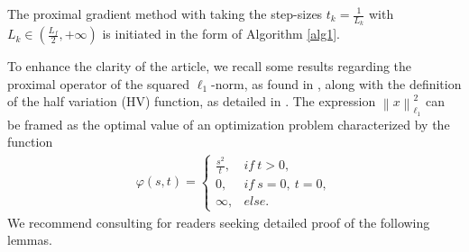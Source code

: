 \documentclass[a4paper,12pt]{article}
\numberwithin{equation}{section}
\begin{document}
\par The proximal gradient method with taking the step-sizes $t_{k}=\frac{1}{L_{k}}$ with $L_{k}\in\left(\frac{L_{f}}{2}, +\infty\right)$ is initiated in the form of Algorithm \ref{alg1}. 

\begin{algorithm}
\caption{Proximal gradient method}
\begin{algorithmic}\label{alg1}
\end{algorithmic}
\end{algorithm}

\par To enhance the clarity of the article, we recall some results regarding the proximal operator of the squared $\ell_{1}$-norm, as found in \cite{B17}, along with the definition of the half variation (HV) function, as detailed in \cite{LD25}. The expression $\left\|x\right\|_{\ell_{1}}^{2}$ can be framed as the optimal value of an optimization problem characterized by the function
\begin{align}\label{equ4.3}
    \varphi\left(s,t\right)=
    \left\{             
             \begin{array}{ll}
             \frac{s^{2}}{t}, & if \ t>0, \\
             0, & if \ s=0,\ t=0, \\
             \infty, & else. 
             \end{array}
    \right.
\end{align}
We recommend consulting \cite[Section 6.8.2]{B17} for readers seeking detailed proof of the following lemmas.
\end{document}
